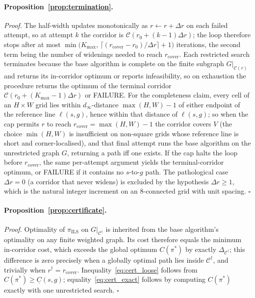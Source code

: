 \documentclass[11pt]{article}
\begin{document}
\paragraph{Proposition~\ref{prop:termination}.}
\noindent\textit{Proof.}
The half-width updates monotonically as $r \leftarrow r + \Delta r$ on each failed attempt, so at attempt $k$ the corridor is $\mathcal{C}(r_0 + (k-1)\Delta r)$; the loop therefore stops after at most $\min\!\big(K_{\max},\, \lceil (r_{\mathrm{cover}} - r_0)/\Delta r \rceil + 1\big)$ iterations, the second term being the number of widenings needed to reach $r_{\mathrm{cover}}$. Each restricted search terminates because the base algorithm is complete on the finite subgraph $G|_{\mathcal{C}(r)}$ and returns its in-corridor optimum or reports infeasibility, so on exhaustion the procedure returns the optimum of the terminal corridor $\mathcal{C}(r_0+(K_{\max}-1)\Delta r)$ or FAILURE. For the completeness claim, every cell of an $H \times W$ grid lies within $d_\infty$-distance $\max(H,W) - 1$ of either endpoint of the reference line $\ell(s,g)$, hence within that distance of $\ell(s,g)$; so when the cap permits $r$ to reach $r_{\mathrm{cover}} = \max(H,W) - 1$ the corridor covers $V$ (the choice $\min(H,W)$ is insufficient on non-square grids whose reference line is short and corner-localised), and that final attempt runs the base algorithm on the unrestricted graph $G$, returning a path iff one exists. If the cap halts the loop before $r_{\mathrm{cover}}$, the same per-attempt argument yields the terminal-corridor optimum, or FAILURE if it contains no $s$-to-$g$ path. The pathological case $\Delta r = 0$ (a corridor that never widens) is excluded by the hypothesis $\Delta r \geq 1$, which is the natural integer increment on an 8-connected grid with unit spacing. $\square$

\paragraph{Proposition~\ref{prop:certificate}.}
\noindent\textit{Proof.}
Optimality of $\pi_{\mathrm{ILS}}$ on $G|_{\mathcal{C}^{\dagger}}$ is inherited from the base algorithm's optimality on any finite weighted graph. Its cost therefore equals the minimum in-corridor cost, which exceeds the global optimum $C(\pi^*)$ by exactly $\Delta_{\mathcal{C}^{\dagger}}$; this difference is zero precisely when a globally optimal path lies inside $\mathcal{C}^{\dagger}$, and trivially when $r^{\dagger} = r_{\mathrm{cover}}$. Inequality~\eqref{eq:cert_loose} follows from $C(\pi^*) \geq \underline{C}(s,g)$; equality~\eqref{eq:cert_exact} follows by computing $C(\pi^*)$ exactly with one unrestricted search. $\square$
\end{document}
